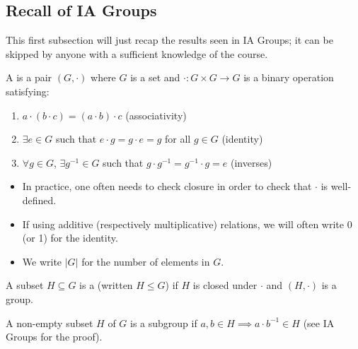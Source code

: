 \documentclass[egregdoesnotlikesansseriftitles,a4paper]{scrartcl}
\begin{document}
\subsection{Recall of IA Groups}
This first subsection will just recap the results seen in IA Groups; it can be skipped by anyone with a sufficient knowledge of the course.
\begin{definition*}[Group]
     A  is a pair $(G, \cdot)$ where $G$ is a set and $\cdot: G \times G \rightarrow  G$ is a binary operation satisfying:
     \begin{enumerate}
         \item $a \cdot (b \cdot c)=(a \cdot b)\cdot c$ (associativity)
         \item $\exists e \in G$ such that $e \cdot g= g \cdot e =g$ for all $g \in G$ (identity)
         \item $\forall g \in G$, $\exists {g}^{-1} \in G$ such that $g \cdot {g}^{-1}={g}^{-1}\cdot g=e$ (inverses)
     \end{enumerate}
     \begin{remarks}
      \begin{itemize}
          \item In practice, one often needs to check closure in order to check that $\cdot $ is well-defined.
          \item If using additive (respectively multiplicative) relations, we will often write 0 (or 1) for the identity.
          \item We write $|G|$ for the number of elements in $G$.
      \end{itemize}
 \end{remarks}
\end{definition*}
\begin{definition*}[Subgroup]
     A subset $H \subseteq G$ is a  (written $H \leq G$) if $H$ is closed under $\cdot$ and $(H, \cdot)$ is a group.
     \begin{remark}
      A non-empty subset $H$ of $G$ is a subgroup if $a,b \in H \implies a \cdot {b}^{-1} \in H$ (see IA Groups for the proof). 
 \end{remark}
\end{definition*}
\end{document}
